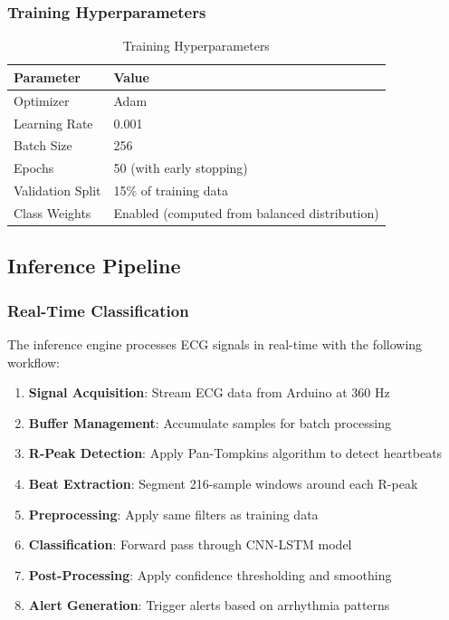 \documentclass[12pt,a4paper]{article}
\begin{document}
\subsubsection{Training Hyperparameters}

\begin{table}[H]
\centering
\begin{tabular}{@{}ll@{}}
\toprule
\textbf{Parameter} & \textbf{Value} \\ 
\midrule
Optimizer & Adam \\
Learning Rate & 0.001 \\
Batch Size & 256 \\
Epochs & 50 (with early stopping) \\
Validation Split & 15\% of training data \\
Class Weights & Enabled (computed from balanced distribution) \\
\bottomrule
\end{tabular}
\caption{Training Hyperparameters}
\label{tab:hyperparameters}
\end{table}

\subsection{Inference Pipeline}

\subsubsection{Real-Time Classification}

The inference engine processes ECG signals in real-time with the following workflow:

\begin{enumerate}
    \item \textbf{Signal Acquisition}: Stream ECG data from Arduino at 360 Hz
    \item \textbf{Buffer Management}: Accumulate samples for batch processing
    \item \textbf{R-Peak Detection}: Apply Pan-Tompkins algorithm to detect heartbeats
    \item \textbf{Beat Extraction}: Segment 216-sample windows around each R-peak
    \item \textbf{Preprocessing}: Apply same filters as training data
    \item \textbf{Classification}: Forward pass through CNN-LSTM model
    \item \textbf{Post-Processing}: Apply confidence thresholding and smoothing
    \item \textbf{Alert Generation}: Trigger alerts based on arrhythmia patterns
\end{enumerate}
\end{document}
